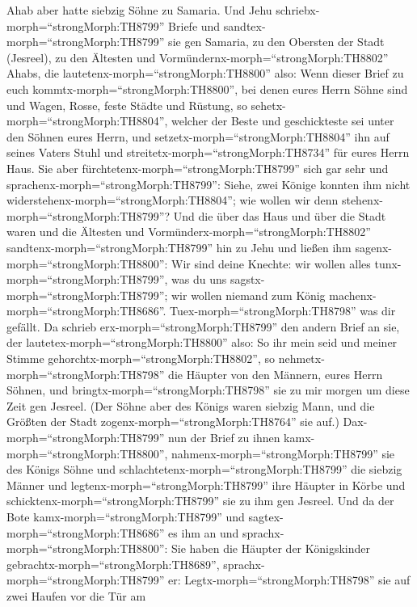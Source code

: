  Ahab aber hatte siebzig Söhne zu Samaria. Und Jehu
schriebx-morph=``strongMorph:TH8799'' Briefe und
sandtex-morph=``strongMorph:TH8799'' sie gen Samaria, zu den Obersten
der Stadt (Jesreel), zu den Ältesten und
Vormündernx-morph=``strongMorph:TH8802'' Ahabs, die
lautetenx-morph=``strongMorph:TH8800'' also:  Wenn dieser
Brief zu euch kommtx-morph=``strongMorph:TH8800'', bei denen eures Herrn
Söhne sind und Wagen, Rosse, feste Städte und Rüstung,  so
sehetx-morph=``strongMorph:TH8804'', welcher der Beste und geschickteste
sei unter den Söhnen eures Herrn, und
setzetx-morph=``strongMorph:TH8804'' ihn auf seines Vaters Stuhl und
streitetx-morph=``strongMorph:TH8734'' für eures Herrn Haus.
 Sie aber fürchtetenx-morph=``strongMorph:TH8799'' sich gar
sehr und sprachenx-morph=``strongMorph:TH8799'': Siehe, zwei Könige
konnten ihm nicht widerstehenx-morph=``strongMorph:TH8804''; wie wollen
wir denn stehenx-morph=``strongMorph:TH8799''?  Und die über
das Haus und über die Stadt waren und die Ältesten und
Vormünderx-morph=``strongMorph:TH8802''
sandtenx-morph=``strongMorph:TH8799'' hin zu Jehu und ließen ihm
sagenx-morph=``strongMorph:TH8800'': Wir sind deine Knechte: wir wollen
alles tunx-morph=``strongMorph:TH8799'', was du uns
sagstx-morph=``strongMorph:TH8799''; wir wollen niemand zum König
machenx-morph=``strongMorph:TH8686''. Tuex-morph=``strongMorph:TH8798''
was dir gefällt.  Da schrieb
erx-morph=``strongMorph:TH8799'' den andern Brief an sie, der
lautetex-morph=``strongMorph:TH8800'' also: So ihr mein seid und meiner
Stimme gehorchtx-morph=``strongMorph:TH8802'', so
nehmetx-morph=``strongMorph:TH8798'' die Häupter von den Männern, eures
Herrn Söhnen, und bringtx-morph=``strongMorph:TH8798'' sie zu mir morgen
um diese Zeit gen Jesreel. (Der Söhne aber des Königs waren siebzig
Mann, und die Größten der Stadt zogenx-morph=``strongMorph:TH8764'' sie
auf.)  Dax-morph=``strongMorph:TH8799'' nun der Brief zu
ihnen kamx-morph=``strongMorph:TH8800'',
nahmenx-morph=``strongMorph:TH8799'' sie des Königs Söhne und
schlachtetenx-morph=``strongMorph:TH8799'' die siebzig Männer und
legtenx-morph=``strongMorph:TH8799'' ihre Häupter in Körbe und
schicktenx-morph=``strongMorph:TH8799'' sie zu ihm gen Jesreel.
 Und da der Bote kamx-morph=``strongMorph:TH8799'' und
sagtex-morph=``strongMorph:TH8686'' es ihm an und
sprachx-morph=``strongMorph:TH8800'': Sie haben die Häupter der
Königskinder gebrachtx-morph=``strongMorph:TH8689'',
sprachx-morph=``strongMorph:TH8799'' er:
Legtx-morph=``strongMorph:TH8798'' sie auf zwei Haufen vor die Tür am
